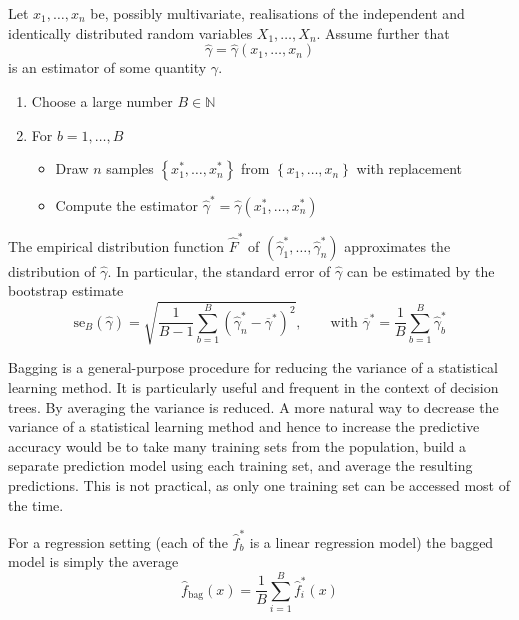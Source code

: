 \documentclass[11pt]{article}
\theoremstyle{definition}
\newcommand*\samplemean[1]{\overline{#1}}
\begin{document}
\newpage
\begin{definition}
	Let $x_1,\dots, x_n$ be, possibly multivariate, realisations of the independent and identically distributed random variables $X_1, \dots, X_n$. Assume further that
	\begin{equation*}
		\hat{\gamma} = \hat{\gamma}(x_1, \dots, x_n)
	\end{equation*}
	is an estimator of some quantity $\gamma$.
	\begin{enumerate}
		\item Choose a large number $B\in \mathbb{N}$
		\item For $b = 1,\dots,B$
		\begin{itemize}
			\item Draw $n$ samples $\left\{ x_1^{*}, \dots, x_n^{*} \right\}$ from $\left\{ x_1, \dots, x_n \right\}$ with replacement
			\item Compute the estimator $\hat{\gamma}^{*} = \hat{\gamma}(x_1^{*}, \dots, x_n^{*})$
		\end{itemize}
	\end{enumerate}
	\item The empirical distribution function $\hat{F}^*$ of $ \left( \hat{\gamma}_1^{*},\dots,\hat{\gamma}_n^{*} \right)$ approximates the distribution of $\hat{\gamma}$. In particular, the standard error of $\hat{\gamma}$ can be estimated by the bootstrap estimate
	\begin{equation*}
		\text{se}_B(\hat{\gamma}) = \sqrt{\frac{1}{B-1}\sum_{b=1}^{B}(\hat{\gamma}_n^{*} - \samplemean{\gamma}^{*})^2},\qquad\text{with } \samplemean{\gamma}^{*} = \frac{1}{B}\sum_{b=1}^{B}\hat{\gamma}_b^*
	\end{equation*}
\end{definition}

Bagging is a general-purpose procedure for reducing the variance of a statistical learning method. It is particularly useful and frequent in the context of decision trees. By averaging the variance is reduced. A more natural way to decrease the variance of a statistical learning method and hence to increase the predictive accuracy would be to take many training sets from the population, build a separate prediction model using each training set, and average the resulting predictions. This is not practical, as only one training set can be accessed most of the time.

For a regression setting (each of the $\hat{f}_b^*$ is a linear regression model) the bagged model is simply the average
\begin{equation*}
	\hat{f}_{\text{bag}}(x) = \frac{1}{B} \sum_{i=1}^{B} \hat{f}_i^*(x)
\end{equation*}
\end{document}
